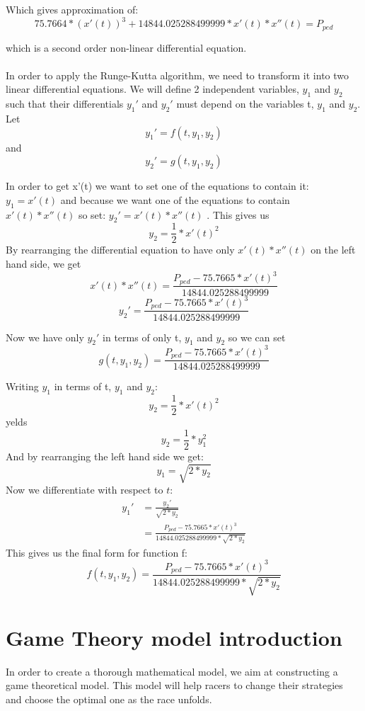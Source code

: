 \documentclass[10pt, a4paper]{report}
\begin{document}
Which gives approximation of:
$$ 75.7664 *(x'(t))^{3} + 14844.025288499999 * x'(t) * x''(t) = P_{ped}$$

which is a second order non-linear differential equation.\\\\
In order to apply the Runge-Kutta algorithm, we need to transform it into two linear differential equations. We will define 2 independent variables, $y_1$ and $y_2$ such that their differentials $y_1'$ and $y_2'$ must depend on the variables t, $y_1$ and $y_2$. Let
$$ y_1' = f( t, y_1, y_2 )$$ and $$y_2' = g( t, y_1, y_2 )$$

In order to get x'(t) we want to set one of the equations to contain it: $y_1 = x'(t)$ and because we want one of the equations to contain $x'(t) * x''(t) $ so set: $y_2' = x'( t ) * x''( t )$ .
This gives us $$ y_{2} = \frac{1}{2} * x'(t)^2 $$
By rearranging the differential equation to have only $ x'( t ) * x''( t )$ on the left hand side, we get
$$ x'( t ) * x''( t ) = \frac{P_{ped} - 75.7665 * x'( t ) ^ 3}{14844.025288499999}$$
$$ y_2' = \frac{P_{ped} - 75.7665 * x'( t ) ^ 3}{14844.025288499999}$$

Now we have only $y_2'$ in terms of only t, $y_1$ and $y_2$ so we can set $$ g( t, y_1, y_2 ) = \frac{P_{ped} - 75.7665 * x'( t ) ^ 3}{14844.025288499999}$$

Writing $y_1$ in terms of t, $y_1$ and $y_2$: $$y_2 = \frac{1}{2} * x'(t)^2$$ yelds $$y_2 = \frac{1}{2} * y_1^2$$
And by rearranging the left hand side we get:
$$y_1 = \sqrt{2 * y_2}$$
Now we differentiate with respect to $t$:
\begin{align*}
y_1' & = \frac{y_2'}{\sqrt{2 * y_2}}\\
& = \frac{P_{ped} - 75.7665 * x'( t ) ^ 3}{14844.025288499999 * \sqrt{2 * y_2}}
\end{align*}
This gives us the final form for function f:
$$ f(t, y_1, y_2) = \frac{P_{ped} - 75.7665 * x'( t ) ^ 3}{14844.025288499999 * \sqrt{2 * y_2}}$$


\section{Game Theory model introduction}

In order to create a thorough mathematical model, we aim at constructing a game theoretical model. This model will help racers to change their strategies and choose the optimal one as the race unfolds.\\
\end{document}
